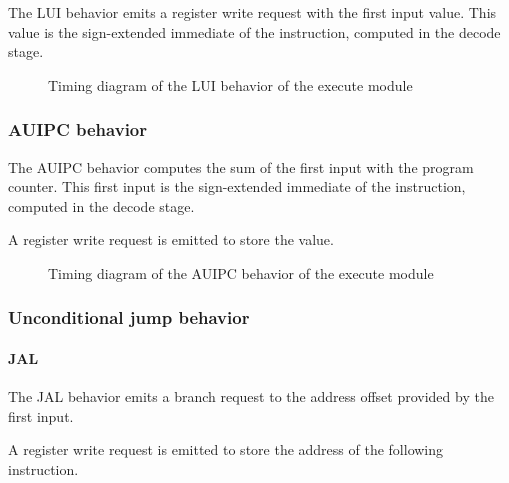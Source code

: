      \begin{content}
          The LUI behavior emits a register write request with the first input value. This value is the sign-extended immediate of the instruction, computed in the decode stage.
        \end{content}

      \begin{figure}[H]
          \centering
          
          \caption{Timing diagram of the LUI behavior of the execute module}
          \label{fig:exm-behavior-lui}
        \end{figure}

    \subsubsection{AUIPC behavior}

      \begin{content}
          The AUIPC behavior computes the sum of the first input with the program counter. This first input is the sign-extended immediate of the instruction, computed in the decode stage.
          
          A register write request is emitted to store the value.
        \end{content}

      \begin{figure}[H]
          \centering
          
          \caption{Timing diagram of the AUIPC behavior of the execute module}
          \label{fig:exm-behavior-auipc}
        \end{figure}

    \subsubsection{Unconditional jump behavior}

      \paragraph{JAL}

      \begin{content}
          The JAL behavior emits a branch request to the address offset provided by the first input.
          
          A register write request is emitted to store the address of the following instruction.
        \end{content}

